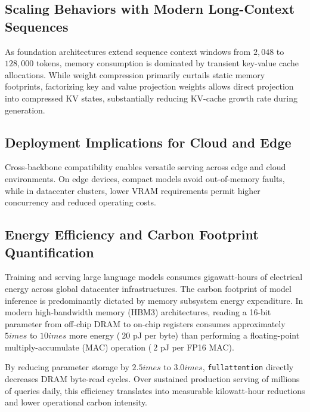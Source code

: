 \subsection{Scaling Behaviors with Modern Long-Context Sequences}
As foundation architectures extend sequence context windows from $2{,}048$ to $128{,}000$ tokens, memory consumption is dominated by transient key-value cache allocations. While weight compression primarily curtails static memory footprints, factorizing key and value projection weights allows direct projection into compressed KV states, substantially reducing KV-cache growth rate during generation.

\subsection{Deployment Implications for Cloud and Edge}
Cross-backbone compatibility enables versatile serving across edge and cloud environments. On edge devices, compact models avoid out-of-memory faults, while in datacenter clusters, lower VRAM requirements permit higher concurrency and reduced operating costs.

\subsection{Energy Efficiency and Carbon Footprint Quantification}
Training and serving large language models consumes gigawatt-hours of electrical energy across global datacenter infrastructures. The carbon footprint of model inference is predominantly dictated by memory subsystem energy expenditure. In modern high-bandwidth memory (HBM3) architectures, reading a 16-bit parameter from off-chip DRAM to on-chip registers consumes approximately $5	imes$ to $10	imes$ more energy ($~20$ pJ per byte) than performing a floating-point multiply-accumulate (MAC) operation ($~2$ pJ per FP16 MAC).

By reducing parameter storage by $2.5	imes$ to $3.0	imes$, \texttt{fullattention} directly decreases DRAM byte-read cycles. Over sustained production serving of millions of queries daily, this efficiency translates into measurable kilowatt-hour reductions and lower operational carbon intensity.
